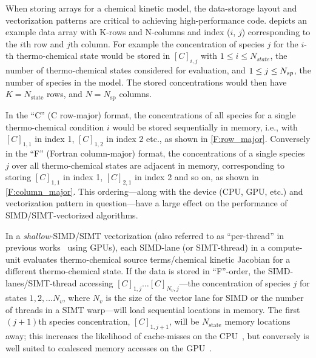 \documentclass[12pt,number,sort&compress,preprint]{elsarticle}
\begin{document}
When storing arrays for a chemical kinetic model, the data-storage layout and vectorization patterns are critical to achieving high-performance code.
 depicts an example data array with K-rows and N-columns and index ($i$, $j$) corresponding to the $i$th row and $j$th column.
For example the concentration of species $j$ for the $i$-th thermo-chemical state would be stored in $[C]_{i, j}$ with $1 \le i \le N_{state}$, the number of thermo-chemical states considered for evaluation, and $1 \le j \le \ns/$, the number of species in the model.
The stored concentrations would then have $K = N_{\text{state}}$ rows, and $N = N_{\text{sp}}$ columns.

In the ``C'' (C row-major) format, the concentrations of all species for a single thermo-chemical condition $i$ would be stored sequentially in memory, i.e., with  $[C]_{1, 1}$ in index \num{1}, $[C]_{1, 2}$ in index \num{2} etc., as shown in \cref{F:row_major}.
Conversely in the ``F'' (Fortran column-major) format, the concentrations of a single species $j$ over all thermo-chemical states are adjacent in memory, corresponding to storing $[C]_{1, 1}$ in index \num{1}, $[C]_{2, 1}$ in index \num{2} and so on, as shown in \cref{F:column_major}.
This ordering---along with the device (CPU, GPU, etc.) and vectorization pattern in question---have a large effect on the performance of SIMD\slash SIMT-vectorized algorithms.

In a \textit{shallow}-SIMD\slash SIMT vectorization (also referred to as ``per-thread'' in previous works~\cite{Stone:2013aa} using GPUs), each SIMD-lane (or SIMT-thread) in a compute-unit evaluates thermo-chemical source terms\slash chemical kinetic Jacobian for a different thermo-chemical state.
If the data is stored in ``F''-order, the SIMD-lanes\slash SIMT-thread accessing $[C]_{1, j}\ldots[C]_{N_v, j}$---the concentration of species $j$ for states $1, 2,\ldots N_v$, where $N_v$ is the size of the vector lane for SIMD or the number of threads in a SIMT warp---will load sequential locations in memory.
The first $(j+1)$th species concentration, $[C]_{1, j+1}$, will be $N_{\text{state}}$ memory locations away; this increases the likelihood of cache-misses on the CPU~\cite{gray2000rules}, but conversely is well suited to coalesced memory accesses on the GPU~\cite{NVIDIA:2018}.
\end{document}
